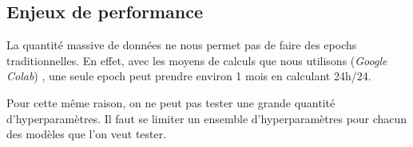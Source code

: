 \subsection{Enjeux de performance}

La quantité massive de données ne nous permet pas de faire des epochs traditionnelles. 
En effet, avec les moyens de calculs que nous utilisons (\emph{Google Colab}) , une seule epoch peut prendre environ 1 mois en calculant 24h/24.

Pour cette même raison, on ne peut pas tester une grande quantité d'hyperparamètres. Il faut se limiter un ensemble d'hyperparamètres pour chacun des modèles que l'on veut tester.

